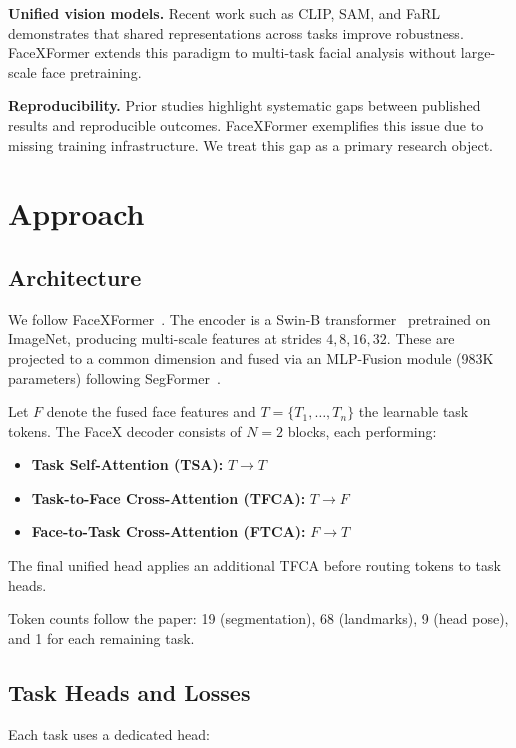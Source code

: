 \textbf{Unified vision models.}
Recent work such as CLIP, SAM, and FaRL~\cite{zheng2022farl} demonstrates that shared representations across tasks improve robustness. FaceXFormer extends this paradigm to multi-task facial analysis without large-scale face pretraining.

\textbf{Reproducibility.}
Prior studies highlight systematic gaps between published results and reproducible outcomes. FaceXFormer exemplifies this issue due to missing training infrastructure. We treat this gap as a primary research object.

\section{Approach}

\subsection{Architecture}

We follow FaceXFormer~\cite{narayan2024facexformer}. The encoder is a Swin-B transformer~\cite{liu2021swin} pretrained on ImageNet, producing multi-scale features at strides $4, 8, 16, 32$. These are projected to a common dimension and fused via an MLP-Fusion module (983K parameters) following SegFormer~\cite{xie2021segformer}.

Let $F$ denote the fused face features and $T = \{T_1, \dots, T_n\}$ the learnable task tokens. The FaceX decoder consists of $N=2$ blocks, each performing:

\begin{itemize}
\item \textbf{Task Self-Attention (TSA):} $T \rightarrow T$
\item \textbf{Task-to-Face Cross-Attention (TFCA):} $T \rightarrow F$
\item \textbf{Face-to-Task Cross-Attention (FTCA):} $F \rightarrow T$
\end{itemize}

The final unified head applies an additional TFCA before routing tokens to task heads.

Token counts follow the paper: 19 (segmentation), 68 (landmarks), 9 (head pose), and 1 for each remaining task.

\subsection{Task Heads and Losses}

Each task uses a dedicated head:

